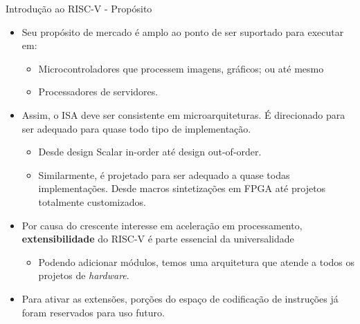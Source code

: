 \documentclass[aspectratio=169]{beamer}
\begin{document}
\begin{frame}{Introdução ao RISC-V - Propósito}
	\begin{itemize}
		\item Seu propósito de mercado é amplo ao ponto de ser suportado para executar em:
		\begin{itemize}
			\item Microcontroladores que processem imagens, gráficos; ou até mesmo
			\item Processadores de servidores.
		\end{itemize}

		\item Assim, o ISA deve ser consistente em microarquiteturas. É direcionado para ser adequado para quase todo tipo de implementação.
		\begin{itemize}
			\item Desde design Scalar in-order até design out-of-order.
			\item Similarmente, é projetado para ser adequado a quase todas implementações. Desde macros sintetizações em FPGA até projetos totalmente customizados.
		\end{itemize}

		\item Por causa do crescente interesse em aceleração em processamento, \textbf{extensibilidade} do RISC-V é parte essencial da universalidade
		\begin{itemize}
			\item Podendo adicionar módulos, temos uma arquitetura que atende a todos os projetos de \textit{hardware}.
		\end{itemize}

		\item Para ativar as extensões, porções do espaço de codificação de instruções já foram reservados para uso futuro.
	\end{itemize}
\end{frame}
\end{document}
